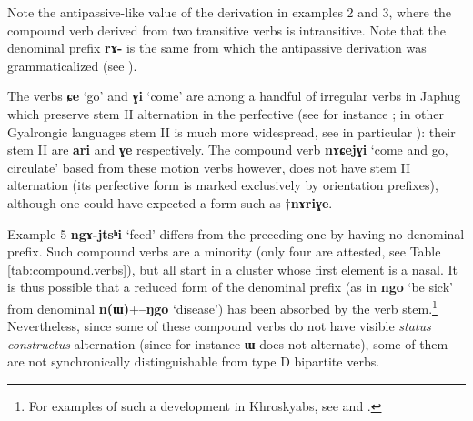 \documentclass[11pt]{article}
\newcommand{\ipa}[1]{{\phon\textbf{#1}}}
\newcommand{\jpg}[2]{\ipa{#1} `#2'}
\begin{document}
Note the antipassive-like value of the derivation in examples 2 and 3, where the compound verb derived from two transitive verbs is intransitive. Note that the denominal prefix \ipa{rɤ-} is the same from which the antipassive derivation was grammaticalized (see  \citealt{jacques14antipassive}). 

The verbs \jpg{ɕe}{go} and \jpg{ɣi}{come} are among a handful of irregular verbs in Japhug which preserve stem II alternation in the perfective (see for instance \citealt[267]{jacques14linking}; in other Gyalrongic languages stem II is much more widespread, see in particular \citealt{jackson00sidaba, jackson04showu, linyj03tense, zhang16bragdbar, lai17khroskyabs}): their stem II are \ipa{ari} and \ipa{ɣe} respectively. The compound verb \jpg{nɤɕejɣi}{come and go, circulate} based from these motion verbs however, does not have stem II alternation (its perfective form is marked exclusively by orientation prefixes), although one could have expected a form such as $\dagger$\ipa{nɤriɣe}.

Example 5 \jpg{ngɤ-jtsʰi}{feed} differs from the preceding one by having no denominal prefix. Such compound verbs are a minority (only four are attested, see Table \ref{tab:compound.verbs}), but all start in a cluster whose first element is a nasal. It is thus possible that a reduced form of the denominal prefix (as in \jpg{ngo}{be sick} from denominal \ipa{n(ɯ)}+\jpg{--ŋgo}{disease}) has been absorbed by the verb stem.\footnote{For examples of such a development in Khroskyabs, see \citet{jacques12incorp} and \citealt{lai13affixale}. } Nevertheless, since some of these compound verbs do not have visible \textit{status constructus} alternation (since for instance \ipa{ɯ} does not alternate), some of them are not synchronically distinguishable from type D bipartite verbs.
\end{document}
